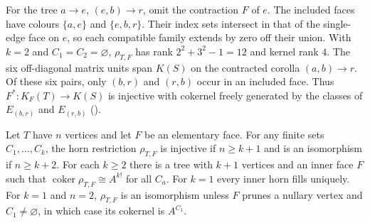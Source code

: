 For the tree $a\to e$, $(e,b)\to r$, omit the contraction $F$ of $e$.
The included faces have colours $\{a,e\}$ and $\{e,b,r\}$. Their index
sets intersect in that of the single-edge face on $e$, so each compatible
family extends by zero off their union. With $k=2$ and $C_1=C_2=\varnothing$, $\rho_{T,F}$
has rank $2^2+3^2-1=12$ and kernel rank $4$. The six off-diagonal matrix units
span $K(S)$ on the contracted corolla $(a,b)\to r$. Of these six pairs,
only $(b,r)$ and $(r,b)$ occur in an included face. Thus $F^*:K_F(T)\to K(S)$
is injective with cokernel freely generated by the classes of $E_{(b,r)}$ and
$E_{(r,b)}$ ().

\begin{theorem}\label{thm:tree-cutoff}
Let $T$ have $n$ vertices and let $F$ be an elementary face.
For any finite sets $C_1,\ldots,C_k$, the horn restriction $\rho_{T,F}$ is
injective if $n\geq k+1$ and is an isomorphism if $n\geq k+2$.
For each $k\geq2$ there is a tree with $k+1$ vertices and an inner face $F$
such that $\operatorname{coker}\rho_{T,F}\cong A^{k!}$ for all $C_a$.
For $k=1$ every inner horn fills uniquely. For $k=1$ and $n=2$, $\rho_{T,F}$ is
an isomorphism unless $F$ prunes a nullary vertex and $C_1\ne\varnothing$,
in which case its cokernel is $A^{C_1}$.
\end{theorem}
